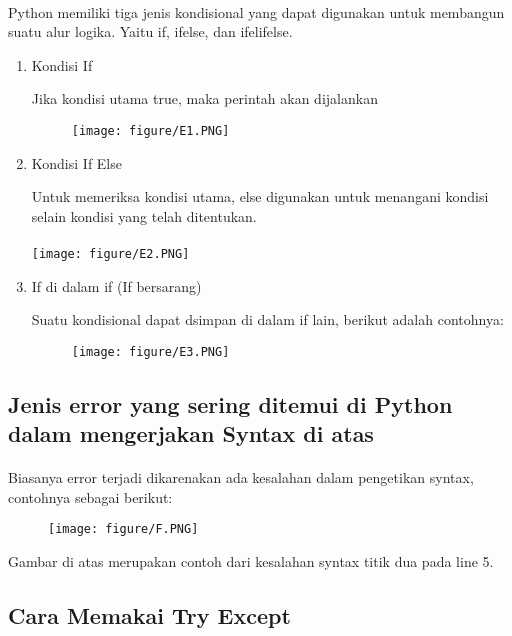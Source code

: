 \documentclass{article}
\begin{document}
\paragraph{}
        Python memiliki tiga jenis kondisional yang dapat digunakan untuk membangun suatu alur logika. Yaitu if, ifelse, dan ifelifelse. 
\begin{enumerate}
    \item Kondisi If
    \par Jika kondisi utama true, maka perintah akan dijalankan
    \begin{figure}[h]
    \centerline{\texttt{[image: figure/E1.PNG]}}
    \end{figure}
    \item Kondisi If Else
    \par Untuk memeriksa kondisi utama, else digunakan untuk menangani kondisi selain kondisi yang telah ditentukan.
    \paragraph{}
    \centerline{\texttt{[image: figure/E2.PNG]}}
    
    \item If di dalam if (If bersarang)
    \par Suatu kondisional dapat dsimpan di dalam if lain, berikut adalah contohnya:
    \begin{figure}[h]
    \centerline{\texttt{[image: figure/E3.PNG]}}
    \end{figure}
\end{enumerate}

\newpage\subsection{Jenis error yang sering ditemui di Python dalam mengerjakan Syntax di atas}
\paragraph{}
        Biasanya error terjadi dikarenakan ada kesalahan dalam pengetikan syntax, contohnya sebagai berikut:
        \begin{figure}[h]
   \centerline{\texttt{[image: figure/F.PNG]}}
        \end{figure}
        \par Gambar di atas merupakan contoh dari kesalahan syntax titik dua pada line 5.

\subsection{Cara Memakai Try Except}
\end{document}
